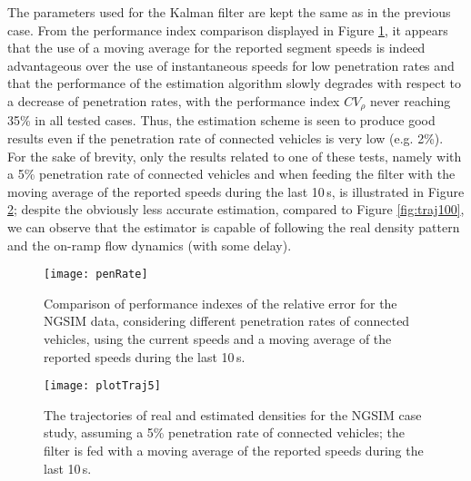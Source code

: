 \documentclass[titlepage,oneside,fleqn,12pt]{article}
\begin{document}
The parameters used for the Kalman filter are kept the same as in the previous case.
From the performance index comparison displayed in Figure \ref{fig:penRates}, it appears that the use of a moving average for the reported segment speeds is indeed advantageous over the use of instantaneous speeds for low penetration rates and that the performance of the estimation algorithm slowly degrades with respect to a decrease of penetration rates, with the performance index $CV_\rho$ never reaching 35\% in all tested cases.
Thus, the estimation scheme is seen to produce good results even if the penetration rate of connected vehicles is very low (e.g. 2\%).
For the sake of brevity, only the results related to one of these tests, namely with a 5\% penetration rate of connected vehicles and when feeding the filter with the moving average of the reported speeds during the last 10\,s, is illustrated in Figure \ref{fig:traj5}; despite the obviously less accurate estimation, compared to Figure \ref{fig:traj100}, we can observe that the estimator is capable of following the real density pattern and the on-ramp flow dynamics (with some delay).

\begin{figure}
\begin{center}
	\texttt{[image: penRate]}
	\caption{Comparison of performance indexes of the relative error for the NGSIM data, considering different penetration rates of connected vehicles, using the current speeds and a moving average of the reported speeds during the last 10\,s.} 
	\label{fig:penRates}
\end{center}
\end{figure}

\begin{figure}
\begin{center}
	\texttt{[image: plotTraj5]}
	\caption{The trajectories of real and estimated densities for the NGSIM case study, assuming a 5\% penetration rate of connected vehicles; the filter is fed with a moving average of the reported speeds during the last 10\,s.} 
	\label{fig:traj5}
\end{center}
\end{figure}
\end{document}
